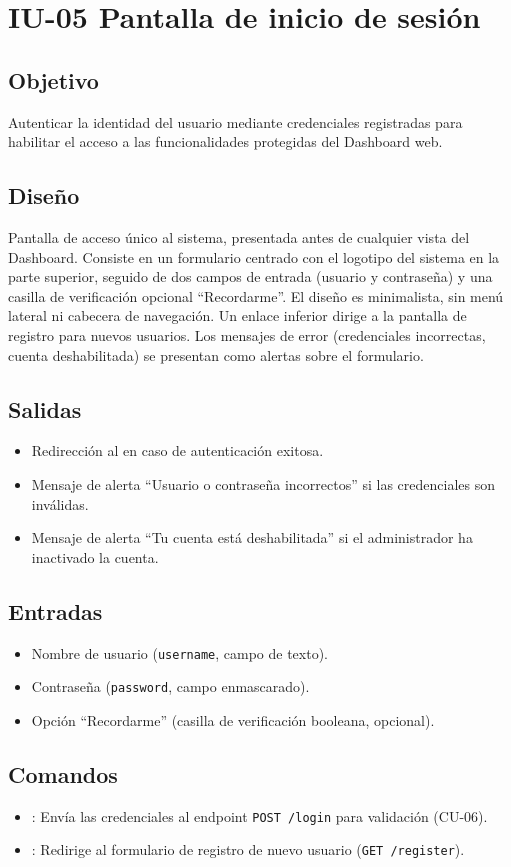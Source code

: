 \section{IU-05 Pantalla de inicio de sesión}

\subsection{Objetivo}
	Autenticar la identidad del usuario mediante credenciales registradas para habilitar el acceso
	a las funcionalidades protegidas del Dashboard web.

\subsection{Diseño}
	Pantalla de acceso único al sistema, presentada antes de cualquier vista del Dashboard.
	Consiste en un formulario centrado con el logotipo del sistema en la parte superior, seguido
	de dos campos de entrada (usuario y contraseña) y una casilla de verificación opcional
	``Recordarme''. El diseño es minimalista, sin menú lateral ni cabecera de navegación. Un
	enlace inferior dirige a la pantalla de registro para nuevos usuarios. Los mensajes de error
	(credenciales incorrectas, cuenta deshabilitada) se presentan como alertas sobre el formulario.


\subsection{Salidas}
	\begin{itemize}
		\item Redirección al  en caso de autenticación exitosa.
		\item Mensaje de alerta ``Usuario o contraseña incorrectos'' si las credenciales son inválidas.
		\item Mensaje de alerta ``Tu cuenta está deshabilitada'' si el administrador ha inactivado
		      la cuenta.
	\end{itemize}

\subsection{Entradas}
	\begin{itemize}
		\item Nombre de usuario (\texttt{username}, campo de texto).
		\item Contraseña (\texttt{password}, campo enmascarado).
		\item Opción ``Recordarme'' (casilla de verificación booleana, opcional).
	\end{itemize}

\subsection{Comandos}
	\begin{itemize}
		\item {}: Envía las credenciales al endpoint
		      \texttt{POST /login} para validación (CU-06).
		\item {}: Redirige al formulario de registro de nuevo usuario
		      (\texttt{GET /register}).
	\end{itemize}
